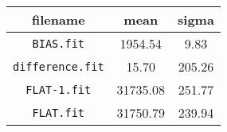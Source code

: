 \begin{table}[ht]
\centering
\begin{tabular}{ccc}
\toprule
filename & mean & sigma \\ 
\midrule 
\verb|BIAS.fit| & \num{1954.54} & \num{9.83}\\
\verb|difference.fit| & \num{15.70} & \num{205.26}\\
\verb|FLAT-1.fit| & \num{31735.08} & \num{251.77}\\
\verb|FLAT.fit| & \num{31750.79} & \num{239.94}\\
\bottomrule
\end{tabular}
\end{table}